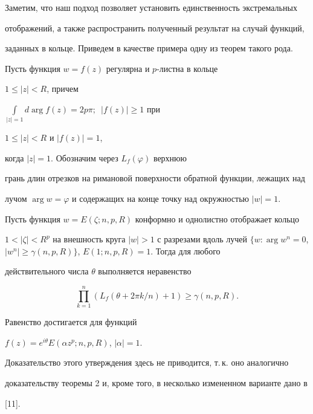 Заметим, что наш подход позволяет установить единственность экстремальных


отображений, а также распространить полученный результат на случай функций,


заданных в кольце. Приведем в качестве примера одну из теорем такого рода.





\begin{thm}


Пусть функция $w=f(z)$ регулярна и $p$-листна в кольце


$1\leq |z|<R$, причем


$\int\limits_{|z|=1} d\arg f(z)=2p\pi;$\ $|f(z)|\geq 1$ при


$1\leq|z|<R$ и $|f(z)|=1$,


когда $|z|=1$. Обозначим через $L_f(\varphi)$ верхнюю


грань длин отрезков на римановой поверхности обратной функции, лежащих над


лучом $\arg w=\varphi$ и содержащих на конце точку над окружностью $|w|=1$.





Пусть функция $w=E(\zeta;n,p,R)$ конформно и однолистно отображает кольцо


$1<|\zeta|<R^p$ на внешность круга $|w|>1$ с разрезами вдоль лучей $\{w:\arg


w^n=0$, $|w^n|\geq\gamma(n,p,R)\}$, $E(1;n,p,R)=1.$ Тогда для любого


действительного числа $\theta$ выполняется неравенство


$$


\prod\limits_{k=1}^{n}(L_f(\theta+2\pi k/n)+1)\geq\gamma(n,p,R).


$$


Равенство достигается для функций


$f(z)=e^{i\theta}E(\alpha z^p;n,p,R)$, $|\alpha|=1.$


\end{thm}





Доказательство этого утверждения здесь не приводится, т.\,к. оно аналогично


доказательству теоремы 2 и, кроме того, в несколько измененном варианте дано в


[11].





